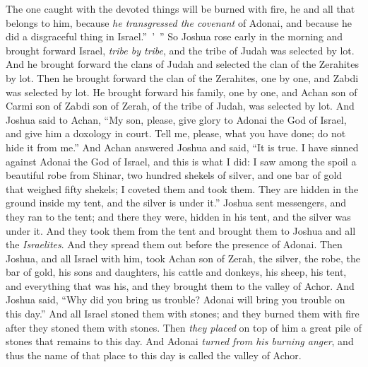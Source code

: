 \begin{biblechapter}
\verse The one caught with the devoted things will be burned with fire, he and all that belongs to him, because \textit{he transgressed the covenant} of Adonai, and because he did a disgraceful thing in Israel.” ’ ”
\verse So Joshua rose early in the morning and brought forward Israel, \textit{tribe by tribe}, and the tribe of Judah was selected by lot.
\verse And he brought forward the clans of Judah and selected the clan of the Zerahites by lot. Then he brought forward the clan of the Zerahites, one by one, and Zabdi was selected by lot.
\verse He brought forward his family, one by one, and Achan son of Carmi son of Zabdi son of Zerah, of the tribe of Judah, was selected by lot.
\verse And Joshua said to Achan, “My son, please, give glory to Adonai the God of Israel, and give him a doxology in court. Tell me, please, what you have done; do not hide it from me.”
\verse And Achan answered Joshua and said, “It is true. I have sinned against Adonai the God of Israel, and this is what I did:
\verse I saw among the spoil a beautiful robe from Shinar, two hundred shekels of silver, and one bar of gold that weighed fifty shekels; I coveted them and took them. They are hidden in the ground inside my tent, and the silver is under it.”
\verse Joshua sent messengers, and they ran to the tent; and there they were, hidden in his tent, and the silver was under it.
\verse And they took them from the tent and brought them to Joshua and all the \textit{Israelites}. And they spread them out before the presence of Adonai.
\verse Then Joshua, and all Israel with him, took Achan son of Zerah, the silver, the robe, the bar of gold, his sons and daughters, his cattle and donkeys, his sheep, his tent, and everything that was his, and they brought them to the valley of Achor.
\verse And Joshua said, “Why did you bring us trouble? Adonai will bring you trouble on this day.” And all Israel stoned them with stones; and they burned them with fire after they stoned them with stones.
\verse Then \textit{they placed} on top of him a great pile of stones that remains to this day. And Adonai \textit{turned from his burning anger}, and thus the name of that place to this day is called the valley of Achor.
\end{biblechapter}

